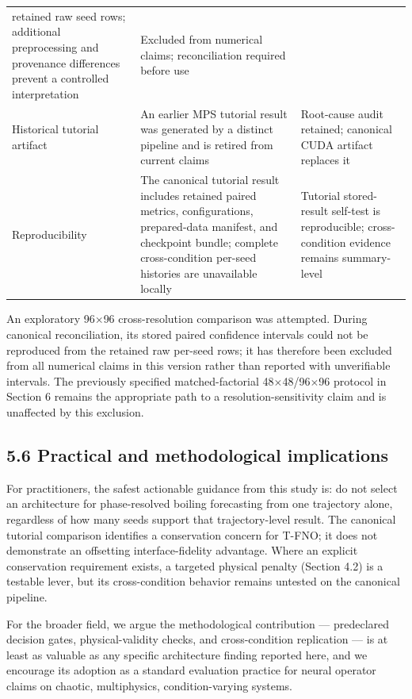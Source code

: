 \documentclass[preprint,12pt]{elsarticle}
\begin{document}
{\begin{longtable}[]{@{}P{0.25\textwidth}P{0.33\textwidth}P{0.29\textwidth}@{}}
retained raw seed rows; additional preprocessing and provenance
differences prevent a controlled interpretation & Excluded from
numerical claims; reconciliation required before use \\
Historical tutorial artifact & An earlier MPS tutorial result was
generated by a distinct pipeline and is retired from current claims &
Root-cause audit retained; canonical CUDA artifact replaces it \\
Reproducibility & The canonical tutorial result includes retained paired
metrics, configurations, prepared-data manifest, and checkpoint bundle;
complete cross-condition per-seed histories are unavailable locally &
Tutorial stored-result self-test is reproducible; cross-condition
evidence remains summary-level \\
\end{longtable}
}

An exploratory 96\ensuremath{\times}96 cross-resolution comparison was attempted. During
canonical reconciliation, its stored paired confidence intervals could
not be reproduced from the retained raw per-seed rows; it has therefore
been excluded from all numerical claims in this version rather than
reported with unverifiable intervals. The previously specified
matched-factorial 48\ensuremath{\times}48/96\ensuremath{\times}96 protocol in Section 6 remains the
appropriate path to a resolution-sensitivity claim and is unaffected by
this exclusion.

\subsection*{5.6 Practical and methodological
implications}\label{56-practical-and-methodological-implications}

For practitioners, the safest actionable guidance from this study is: do
not select an architecture for phase-resolved boiling forecasting from
one trajectory alone, regardless of how many seeds support that
trajectory-level result. The canonical tutorial comparison identifies a
conservation concern for T-FNO; it does not demonstrate an offsetting
interface-fidelity advantage. Where an explicit conservation requirement
exists, a targeted physical penalty (Section 4.2) is a testable lever,
but its cross-condition behavior remains untested on the canonical
pipeline.

For the broader field, we argue the methodological contribution ---
predeclared decision gates, physical-validity checks, and
cross-condition replication --- is at least as valuable as any specific
architecture finding reported here, and we encourage its adoption as a
standard evaluation practice for neural operator claims on chaotic,
multiphysics, condition-varying systems.
\end{document}
